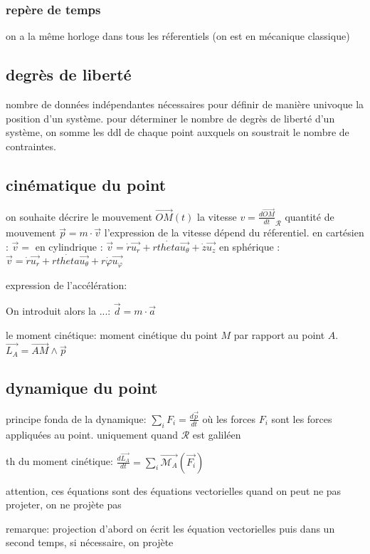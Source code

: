 \documentclass[../main.tex]{subfile}
\begin{document}
\subsubsection{repère de temps}
on a la même horloge dans tous les réferentiels (on est en mécanique classique)

\subsection{degrès de liberté}
nombre de données indépendantes nécessaires pour définir de manière univoque la position d'un système.
pour déterminer le nombre de degrès de liberté d'un système, on somme les ddl de chaque point auxquels on soustrait le nombre de contraintes.

\subsection{cinématique du point}
on souhaite décrire le mouvement $\vec{OM}(t)$
la vitesse $v = \frac{d\vec{OM}}{dt}_\mathcal{R}$
quantité de mouvement $\vec{p} = m \cdot \vec{v}$
l'expression de la vitesse dépend du réferentiel.
en cartésien : $\vec{v} = $%
en cylindrique : $\vec{v} = \dot{r}\vec{u_r} + r\dot{theta}\vec{u_\theta} +\dot{z}\vec{u_z}$
en sphérique : $\vec{v} = \dot{r}\vec{u_r} + r\dot{theta}\vec{u_\theta} + r\dot{\varphi}\vec{u_\varphi}$

expression de l'accélération:


On introduit alors la ...:
$\vec{d} = m \cdot \vec{a}$

le moment cinétique:
moment cinétique du point $M$ par rapport au point $A$.
$\vec{L_A} = \vec{AM} \wedge \vec{p}$


\subsection{dynamique du point}
principe fonda de la dynamique:
$\sum\limits_i F_i = \frac{d\vec{p}}{dt}$
où les forces $F_i$ sont les forces appliquées au point.
uniquement quand $\mathcal{R}$ est galiléen

th du moment cinétique:
$\frac{d\vec{L_A}}{dt} = \sum\limits_i \vec{\mathcal{M}_A}(\vec{F_i})$

attention, ces équations sont des équations vectorielles
quand on peut ne pas projeter, on ne projète pas


remarque: projection
d'abord on écrit les équation vectorielles 
puis dans un second temps, si nécessaire, on projète
\end{document}
